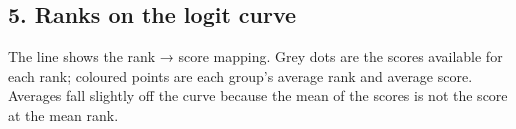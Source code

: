 \documentclass[
]{article}
\newenvironment{Shaded}{\begin{snugshade}}{\end{snugshade}}
\newcommand{\DecValTok}[1]{\textcolor[rgb]{0.00,0.00,0.81}{#1}}
\newcommand{\FunctionTok}[1]{\textcolor[rgb]{0.13,0.29,0.53}{\textbf{#1}}}
\newcommand{\NormalTok}[1]{#1}
\newcommand{\SpecialCharTok}[1]{\textcolor[rgb]{0.81,0.36,0.00}{\textbf{#1}}}
\begin{document}
\begin{Shaded}
\end{Shaded}

\subsection{5. Ranks on the logit curve}\label{ranks-on-the-logit-curve}

The line shows the rank → score mapping. Grey dots are the scores
available for each rank; coloured points are each group's average rank
and average score. Averages fall slightly off the curve because the mean
of the scores is not the score at the mean rank.
\end{document}
